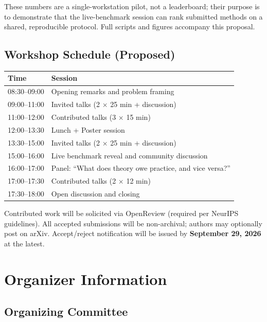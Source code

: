 \documentclass{article}
\begin{document}
These numbers are a single-workstation pilot, not a leaderboard; their purpose is
to demonstrate that the live-benchmark session can rank submitted methods on a
shared, reproducible protocol.  Full scripts and figures accompany this proposal.

\subsection*{Workshop Schedule (Proposed)}

\begin{tabular}{ll}
\toprule
Time & Session \\
\midrule
08:30--09:00 & Opening remarks and problem framing \\
09:00--11:00 & Invited talks (2 $\times$ 25 min + discussion) \\
11:00--12:00 & Contributed talks (3 $\times$ 15 min) \\
12:00--13:30 & Lunch + Poster session \\
13:30--15:00 & Invited talks (2 $\times$ 25 min + discussion) \\
15:00--16:00 & Live benchmark reveal and community discussion \\
16:00--17:00 & Panel: ``What does theory owe practice, and vice versa?'' \\
17:00--17:30 & Contributed talks (2 $\times$ 12 min) \\
17:30--18:00 & Open discussion and closing \\
\bottomrule
\end{tabular}

Contributed work will be solicited via OpenReview (required per NeurIPS guidelines).
All accepted submissions will be non-archival; authors may optionally post on arXiv.
Accept/reject notification will be issued by \textbf{September 29, 2026} at the latest.


\newpage
\section*{Organizer Information}

\subsection*{Organizing Committee}
\end{document}
